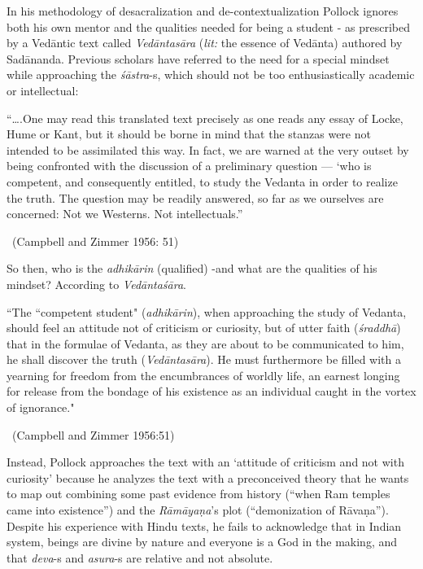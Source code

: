In his methodology of desacralization and de-contextualization Pollock ignores both his own mentor and the qualities needed for being a student - as prescribed by a Vedāntic text called \textit{Vedāntasāra} (\textit{lit:} the essence of Vedānta) authored by Sadānanda. Previous scholars have referred to the need for a special mindset while approaching the \textit{śāstra}-s, which should not be too enthusiastically academic or intellectual:

\begin{myquote}
“….One may read this translated text precisely as one reads any essay of Locke, Hume or Kant, but it should be borne in mind that the stanzas were not intended to be assimilated this way. In fact, we are warned at the very outset by being confronted with the discussion of a preliminary question — ‘who is competent, and consequently entitled, to study the Vedanta in order to realize the truth. The question may be readily answered, so far as we ourselves are concerned: Not we Westerns. Not intellectuals.” 

\vskip -5pt

~\hfill (Campbell and Zimmer 1956: 51)
\end{myquote}

So then, who is the \textit{adhikārin} (qualified) -and what are the qualities of his mindset? According to \textit{Vedāntaśāra}.

\begin{myquote}
“The “competent student" (\textit{adhikārin}), when approaching the study of Vedanta, should feel an attitude not of criticism or curiosity, but of utter faith (\textit{śraddhā}) that in the formulae of Vedanta, as they are about to be communicated to him, he shall discover the truth (\textit{Vedāntasāra}). He must furthermore be filled with a yearning for freedom from the encumbrances of worldly life, an earnest longing for release from the bondage of his existence as an individual caught in the vortex of ignorance." 

\vskip -5pt

~\hfill (Campbell and Zimmer 1956:51)
\end{myquote}

Instead, Pollock approaches the text with an ‘attitude of criticism and not with curiosity’ because he analyzes the text with a preconceived theory that he wants to map out combining some past evidence from history (“when Ram temples came into existence”) and the \textit{Rāmāyaṇa}’s plot (“demonization of Rāvaṇa”). Despite his experience with Hindu texts, he fails to acknowledge that in Indian system, beings are divine by nature and everyone is a God in the making, and that \textit{deva}-s and \textit{asura}-s are relative and not absolute.

